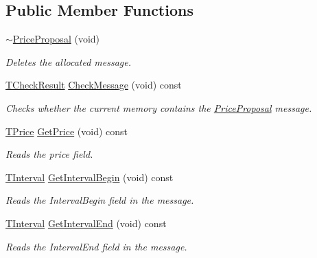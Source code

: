 \subsection*{Public Member Functions}
\begin{DoxyCompactItemize}
\item 
\hyperlink{class_terra_swarm_1_1_synchronous_1_1_price_proposal_aadf58e38bb170e8e84b611b444022393}{$\sim$\-Price\-Proposal} (void)
\begin{DoxyCompactList}\small\item\em Deletes the allocated message. \end{DoxyCompactList}\item 
\hyperlink{class_terra_swarm_1_1_synchronous_1_1_price_proposal_ab5aef6a74a44439eb880f7dbff610b57}{T\-Check\-Result} \hyperlink{class_terra_swarm_1_1_synchronous_1_1_price_proposal_af3e0454c5d8e4b83fc0fc2c1b0838e96}{Check\-Message} (void) const 
\begin{DoxyCompactList}\small\item\em Checks whether the current memory contains the \hyperlink{class_terra_swarm_1_1_synchronous_1_1_price_proposal}{Price\-Proposal} message. \end{DoxyCompactList}\item 
\hyperlink{class_terra_swarm_1_1_synchronous_1_1_price_proposal_a663093d390a30942a07eee3681ff8fe2}{T\-Price} \hyperlink{class_terra_swarm_1_1_synchronous_1_1_price_proposal_ad8e9ec2676e1cce4e77cf3fff3bf5797}{Get\-Price} (void) const 
\begin{DoxyCompactList}\small\item\em Reads the price field. \end{DoxyCompactList}\item 
\hyperlink{class_terra_swarm_1_1_synchronous_1_1_price_proposal_a37e6344d030c7695bb9cb341648928ee}{T\-Interval} \hyperlink{class_terra_swarm_1_1_synchronous_1_1_price_proposal_a935112fee62baf6ca05eeb523bd4faf9}{Get\-Interval\-Begin} (void) const 
\begin{DoxyCompactList}\small\item\em Reads the Interval\-Begin field in the message. \end{DoxyCompactList}\item 
\hyperlink{class_terra_swarm_1_1_synchronous_1_1_price_proposal_a37e6344d030c7695bb9cb341648928ee}{T\-Interval} \hyperlink{class_terra_swarm_1_1_synchronous_1_1_price_proposal_a922bd8c1cbc702f1224b1e6dce6beb3d}{Get\-Interval\-End} (void) const 
\begin{DoxyCompactList}\small\item\em Reads the Interval\-End field in the message. \end{DoxyCompactList}\end{DoxyCompactItemize}
